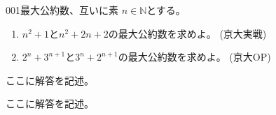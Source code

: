 \begin{thm}{001}{}{最大公約数、互いに素}
 $n\in \mathbb{N}$とする。
 \begin{enumerate}
  \item $n^2+1$と$n^2+2n+2$の最大公約数を求めよ。  (京大実戦)
  \item $2^n+3^{n+1}$と$3^n+2^{n+1}$の最大公約数を求めよ。  (京大OP)
 \end{enumerate}
\end{thm}

ここに解答を記述。

ここに解答を記述。
